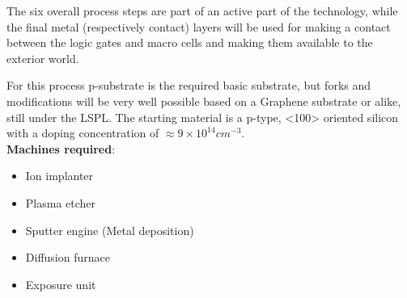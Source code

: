 The six overall process steps are part of an active part of the technology, while the final metal (respectively contact) layers will be used for making a contact between the logic gates and macro cells and making them available to the exterior world.

For this process p-substrate is the required basic substrate, but forks and modifications will be very well possible based on a Graphene substrate or alike, still under the LSPL.
The starting material is a p-type, <100> oriented silicon with a doping concentration of $\approx 9\times10^{14}cm^{-3}$.\\

\textbf{Machines required}:
\begin{itemize}
	\item Ion implanter
	\item Plasma etcher
	\item Sputter engine (Metal deposition) 
	\item Diffusion furnace
	\item Exposure unit
\end{itemize}
